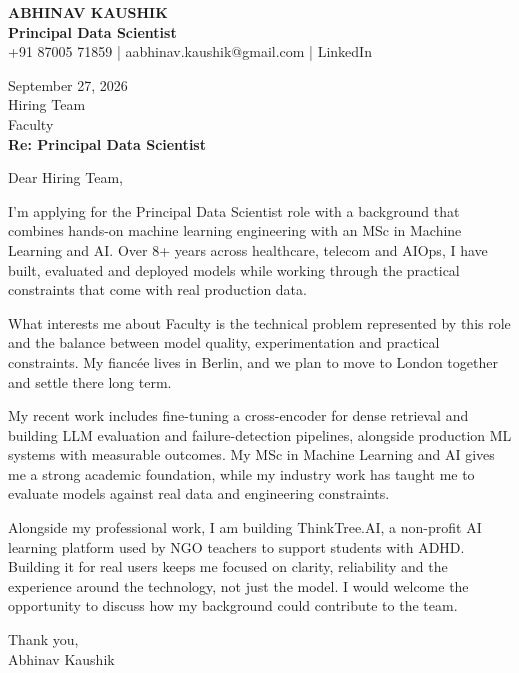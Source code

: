 \documentclass[10pt,a4paper]{article}
\begin{document}
\begin{center}
{\Large\bfseries ABHINAV KAUSHIK}\\[2pt]
{\bfseries Principal Data Scientist}\\[2pt]
+91 87005 71859 \quad | \quad aabhinav.kaushik@gmail.com \quad | \quad LinkedIn
\end{center}
\vspace{8pt}
September 27, 2026\\[6pt]
Hiring Team\\
Faculty\\[4pt]
\textbf{Re: Principal Data Scientist}

Dear Hiring Team,

I’m applying for the Principal Data Scientist role with a background that combines hands-on machine learning engineering with an MSc in Machine Learning and AI. Over 8+ years across healthcare, telecom and AIOps, I have built, evaluated and deployed models while working through the practical constraints that come with real production data.

What interests me about Faculty is the technical problem represented by this role and the balance between model quality, experimentation and practical constraints. My fiancée lives in Berlin, and we plan to move to London together and settle there long term.

My recent work includes fine-tuning a cross-encoder for dense retrieval and building LLM evaluation and failure-detection pipelines, alongside production ML systems with measurable outcomes. My MSc in Machine Learning and AI gives me a strong academic foundation, while my industry work has taught me to evaluate models against real data and engineering constraints.

Alongside my professional work, I am building ThinkTree.AI, a non-profit AI learning platform used by NGO teachers to support students with ADHD. Building it for real users keeps me focused on clarity, reliability and the experience around the technology, not just the model. I would welcome the opportunity to discuss how my background could contribute to the team.

Thank you,\\
Abhinav Kaushik
\end{document}
